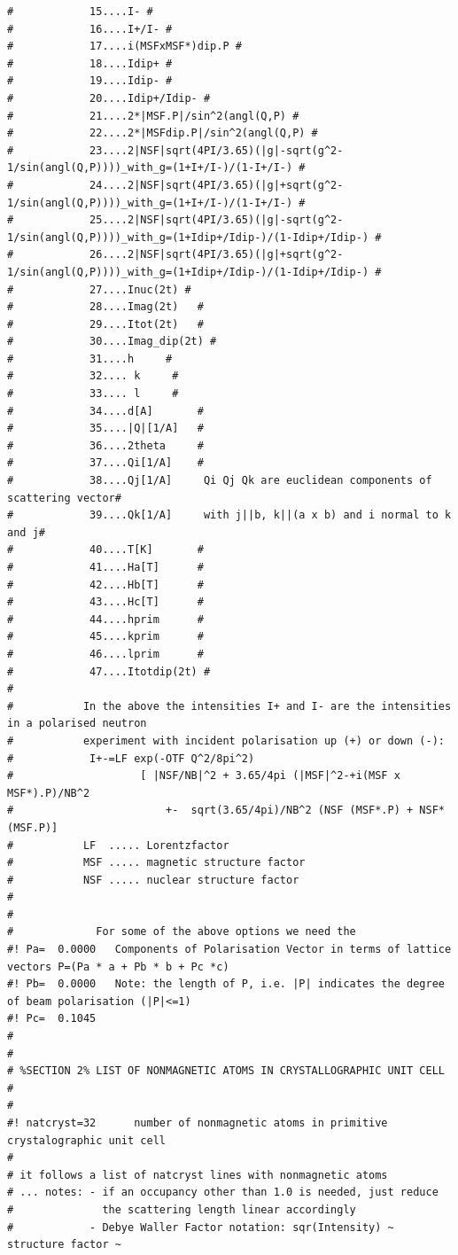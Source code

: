 {\begin{verbatim}
#            15....I- #
#            16....I+/I- #
#            17....i(MSFxMSF*)dip.P #
#            18....Idip+ #
#            19....Idip- #
#            20....Idip+/Idip- #
#            21....2*|MSF.P|/sin^2(angl(Q,P) #
#            22....2*|MSFdip.P|/sin^2(angl(Q,P) #
#            23....2|NSF|sqrt(4PI/3.65)(|g|-sqrt(g^2-1/sin(angl(Q,P))))_with_g=(1+I+/I-)/(1-I+/I-) #
#            24....2|NSF|sqrt(4PI/3.65)(|g|+sqrt(g^2-1/sin(angl(Q,P))))_with_g=(1+I+/I-)/(1-I+/I-) #
#            25....2|NSF|sqrt(4PI/3.65)(|g|-sqrt(g^2-1/sin(angl(Q,P))))_with_g=(1+Idip+/Idip-)/(1-Idip+/Idip-) #
#            26....2|NSF|sqrt(4PI/3.65)(|g|+sqrt(g^2-1/sin(angl(Q,P))))_with_g=(1+Idip+/Idip-)/(1-Idip+/Idip-) #
#            27....Inuc(2t)	#
#            28....Imag(2t)   #
#            29....Itot(2t)   #
#            30....Imag_dip(2t) #
#            31....h     #
#            32.... k     #
#            33.... l     #
#            34....d[A]       #
#            35....|Q|[1/A]   #
#            36....2theta     #
#            37....Qi[1/A]    #
#            38....Qj[1/A]     Qi Qj Qk are euclidean components of scattering vector#
#            39....Qk[1/A]     with j||b, k||(a x b) and i normal to k and j#
#            40....T[K]       #
#            41....Ha[T]      #
#            42....Hb[T]      #
#            43....Hc[T]      #
#            44....hprim      #
#            45....kprim      #
#            46....lprim      #
#            47....Itotdip(2t) #
#
#           In the above the intensities I+ and I- are the intensities in a polarised neutron
#           experiment with incident polarisation up (+) or down (-):
#            I+-=LF exp(-OTF Q^2/8pi^2) 
#                    [ |NSF/NB|^2 + 3.65/4pi (|MSF|^2-+i(MSF x MSF*).P)/NB^2 
#                        +-  sqrt(3.65/4pi)/NB^2 (NSF (MSF*.P) + NSF* (MSF.P)]
#           LF  ..... Lorentzfactor
#           MSF ..... magnetic structure factor
#           NSF ..... nuclear structure factor
#
#
#             For some of the above options we need the
#! Pa=  0.0000   Components of Polarisation Vector in terms of lattice vectors P=(Pa * a + Pb * b + Pc *c)
#! Pb=  0.0000   Note: the length of P, i.e. |P| indicates the degree of beam polarisation (|P|<=1)
#! Pc=  0.1045
#
#
# %SECTION 2% LIST OF NONMAGNETIC ATOMS IN CRYSTALLOGRAPHIC UNIT CELL
#
#
#! natcryst=32      number of nonmagnetic atoms in primitive crystalographic unit cell
#
# it follows a list of natcryst lines with nonmagnetic atoms
# ... notes: - if an occupancy other than 1.0 is needed, just reduce 
#              the scattering length linear accordingly
#            - Debye Waller Factor notation: sqr(Intensity) ~ structure factor ~ 

\end{verbatim}}

